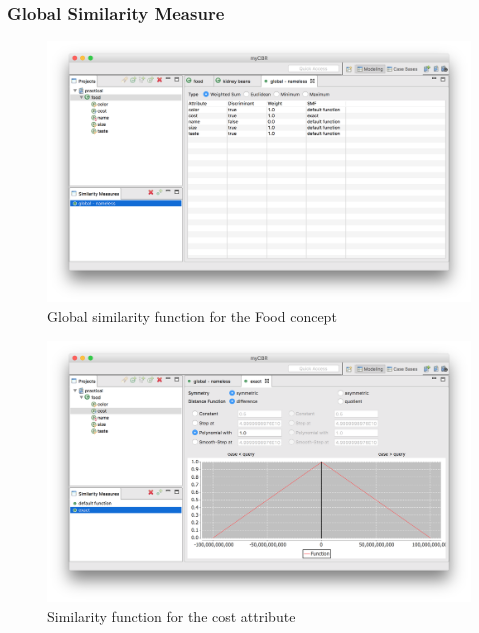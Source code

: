 \documentclass[paper=a4, fontsize=11pt]{scrartcl} %
\numberwithin{equation}{section} %
\numberwithin{figure}{section} %
\numberwithin{table}{section} %
\begin{document}
\subsubsection{Global Similarity Measure}


\begin{figure}[H]
    \centering
    \includegraphics[width=\linewidth]{img/global.png}
    \caption{Global similarity function for the Food concept} \label{fig:global}
\end{figure}


\begin{figure}[H]
    \centering
    \includegraphics[width=\linewidth]{img/cost.png}
    \caption{Similarity function for the cost attribute} \label{fig:cost}
\end{figure}
\end{document}
